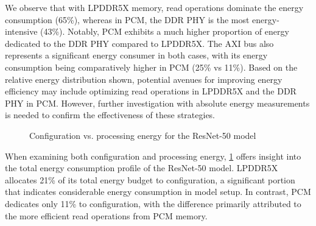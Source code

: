 

We observe that with LPDDR5X memory, read operations dominate the energy consumption (65\%), whereas in PCM, the DDR PHY is the most energy-intensive (43\%).
Notably, PCM exhibits a much higher proportion of energy dedicated to the DDR PHY compared to LPDDR5X.
The AXI bus also represents a significant energy consumer in both cases, with its energy consumption being comparatively higher in PCM (25\% vs 11\%).
Based on the relative energy distribution shown, potential avenues for improving energy efficiency may include optimizing read operations in LPDDR5X and the DDR PHY in PCM.
However, further investigation with absolute energy measurements is needed to confirm the effectiveness of these strategies.

\begin{figure}[hbtp]
    \centering
    \hfill
    \caption{Configuration vs. processing energy for the ResNet-50 model}
    \label{fig:resnet50_conf_proc}
\end{figure}

When examining both configuration and processing energy, \cref{fig:resnet50_conf_proc} offers insight into the total energy consumption profile of the ResNet-50 model.
LPDDR5X allocates 21\% of its total energy budget to configuration, a significant portion that indicates considerable energy consumption in model setup.
In contrast, PCM dedicates only 11\% to configuration, with the difference primarily attributed to the more efficient read operations from PCM memory.

